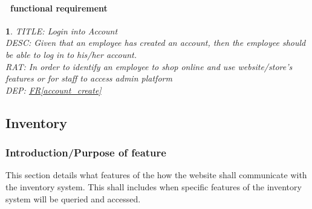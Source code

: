 \documentclass{scrreprt}
\theoremstyle{funreq}
\newtheorem{funreq}{}
\newcommand*{\reqref}[1]{\hyperref[#1]{FR\ref*{#1}}}
\begin{document}
\paragraph[]{\Subsectionname ~functional requirement }
\begin{funreq}
	\label{account_login}
	TITLE: Login into Account\\
	DESC: Given that an employee has created an account, then the employee should be able to log in to his/her account.\\
	RAT: In order to identify an employee to shop online and use website/store’s features or for staff to access admin platform\\
	DEP: \reqref{account_create}
\end{funreq}

	\subsection{Inventory}
	\subsubsection{Introduction/Purpose of feature}
	This section details what features of the how the website shall communicate with the inventory system.  This shall includes when specific features of the inventory system will be queried and accessed.  
	
\end{document}
